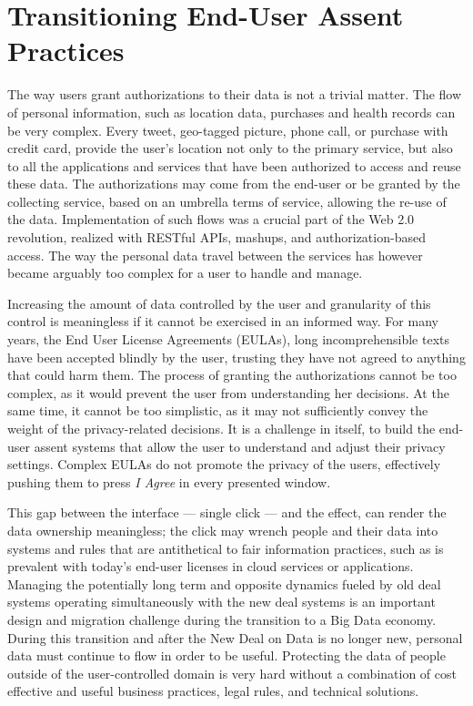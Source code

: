 \section{Transitioning End-User Assent Practices }

The way users grant authorizations to their data is not a trivial matter.
The flow of personal information, such as location data, purchases and health records can be very complex.
Every tweet, geo-tagged picture, phone call, or purchase with credit card, provide the user's location not only to the primary service, but also to all the applications and services that have been authorized to access and reuse these data.
The authorizations may come from the end-user or be granted by the collecting service, based on an umbrella terms of service, allowing the re-use of the data.
Implementation of such flows was a crucial part of the Web 2.0 revolution, realized with RESTful APIs, mashups, and authorization-based access.
The way the personal data travel between the services has however became arguably too complex for a user to handle and manage.

Increasing the amount of data controlled by the user and granularity of this control is meaningless if it cannot be exercised in an informed way.
For many years, the End User License Agreements (EULAs), long incomprehensible texts have been accepted blindly by the user, trusting they have not agreed to anything that could harm them.
The process of granting the authorizations cannot be too complex, as it would prevent the user from understanding her decisions.
At the same time, it cannot be too simplistic, as it may not sufficiently convey the weight of the privacy-related decisions.
It is a challenge in itself, to build the end-user assent systems that allow the user to understand and adjust their privacy settings.
Complex EULAs do not promote the privacy of the users, effectively pushing them to press \emph{I Agree} in every presented window. 

This gap between the interface --- single click --- and the effect, can render the data ownership meaningless; the click may wrench people and their data into systems and rules that are antithetical to fair information practices, such as is prevalent with today's end-user licenses in cloud services or applications.
Managing the potentially long term and opposite dynamics fueled by old deal systems operating simultaneously with the new deal systems is an important design and migration challenge during the transition to a Big Data economy.
During this transition and after the New Deal on Data is no longer new, personal data must continue to flow in order to be useful.
Protecting the data of people outside of the user-controlled domain is very hard without a combination of cost effective and useful business practices, legal rules, and technical solutions.

